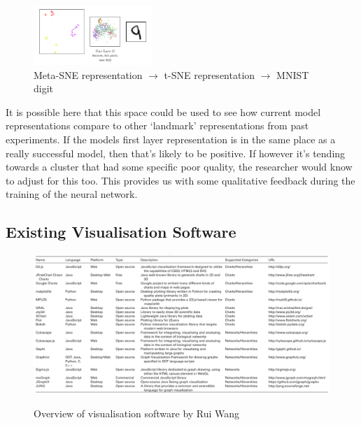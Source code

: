 \documentclass[a4paper,11pt,titlepage]{article}
\begin{document}
		\begin{figure}[H]
			\centering
						
    			\includegraphics[width=0.40\textwidth]{img/colah_meta_sne.png}
\caption{Meta-SNE representation $\rightarrow$ t-SNE representation $\rightarrow$ MNIST digit}
 		\end{figure}
 		
		It is possible here that this space could be used to see how current model representations compare to other `landmark' representations from past experiments. If the models first layer representation is in the same place as a really successful model, then that's likely to be positive. If however it's tending towards a cluster that had some specific poor quality, the researcher would know to adjust for this too. This provides us with some qualitative feedback during the training of the neural network. 
		


\subsection{Existing Visualisation Software}

		\begin{figure}[H]
    			\centering	
		{{\includegraphics[width=18cm]
    				{img/rui_wang_vis_overview} 
    			}}%
    			\caption{Overview of visualisation software by Rui Wang}%
    		\label{fig:studentprofile}
		\end{figure}
		
\end{document}
